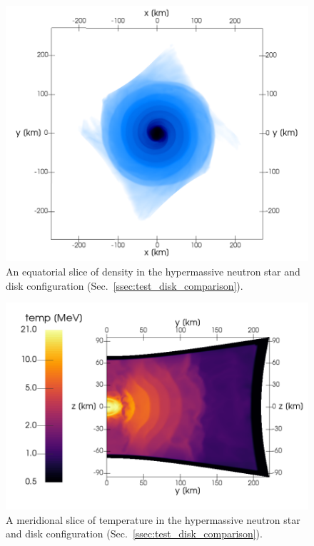 \documentclass[aps,floatfix,prd,superscriptaddress,twocolumn]{revtex4-1}
\begin{document}
\begin{figure}
  \includegraphics[width=\columnwidth]{production-colormap-equat-rho}
  \caption{An equatorial slice of density in the hypermassive neutron
    star and disk configuration (Sec.~\ref{ssec:test_disk_comparison}).}
  \label{fig:nsns_rho_equat}
\end{figure}

\begin{figure}
  \includegraphics[width=\columnwidth]{production-colormap-merid-temp}
  \caption{A meridional slice of temperature in the hypermassive neutron
    star and disk configuration (Sec.~\ref{ssec:test_disk_comparison}).}
  \label{fig:nsns_temp_merid}
\end{figure}
\end{document}
